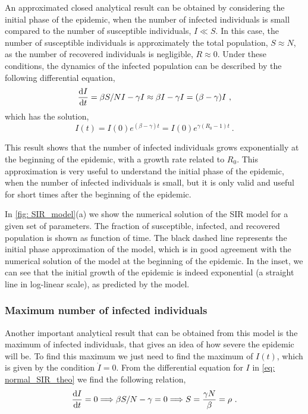 An approximated closed analytical result can be obtained by considering the
initial phase of the epidemic, when the number of infected individuals is small
compared to the number of susceptible individuals, $I\ll S$. In this case, the
number of susceptible individuals is approximately the total population,
$S\approx N$, as the number of recovered individuals is negligible,
$R\approx0$. Under these conditions, the dynamics of the infected population
can be described by the following differential equation,
\begin{equation}
  \frac{\mathrm{d} I}{\mathrm{d} t}=\beta S/N I-\gamma I\approx\beta I-\gamma I=(\beta-\gamma)I \ ,
\end{equation}
which has the solution,
\begin{equation}
  I(t)=I(0)e^{(\beta-\gamma)t}=I(0)e^{\gamma(R_0-1)t} \ .
\end{equation}

This result shows that the number of infected individuals grows exponentially
at the beginning of the epidemic, with a growth rate related to $R_0$.
This approximation is very useful to understand the initial phase of the
epidemic, when the number of infected individuals is small, but it is only
valid and useful for short times after the beginning of the epidemic.

In \cref{fig: SIR_model}(a) we show the numerical solution of the SIR model for
a given set of parameters. The fraction of susceptible, infected, and recovered
population is shown as function of time. The black dashed line represents the
initial phase approximation of the model, which is in good agreement with the
numerical solution of the model at the beginning of the epidemic. In the inset,
we can see that the initial growth of the epidemic is indeed exponential
(a straight line in log-linear scale), as predicted by the model.

\subsubsection*{Maximum number of infected individuals}

Another important analytical result that can be obtained from this model is
the maximum of infected individuals, that gives an idea of how severe the
epidemic will be. To find this maximum we just need to find the maximum of
$I(t)$, which is given by the condition $\dot{I}=0$. From the differential
equation for $I$ in \cref{eq: normal_SIR_theo} we find the following relation,
\begin{equation}
  \frac{\mathrm{d} I}{\mathrm{d} t}=0\Longrightarrow\beta S/N-\gamma=0\Longrightarrow
  S=\frac{\gamma N}{\beta}=\rho \ .
\end{equation}

